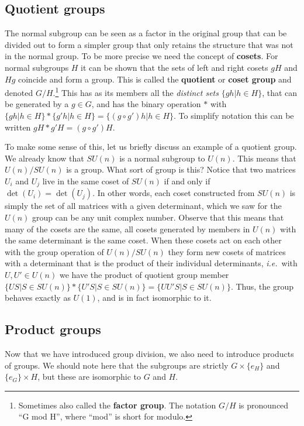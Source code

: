 \documentclass[notes.tex]{subfiles}
\begin{document}
\subsection{Quotient groups}
The normal subgroup can be seen as a factor in the original group that can be divided out to form a simpler group that only retains the structure that was not in the normal group. To be more precise we need the concept of {\bf cosets}. 
For normal subgroups $H$ it can be shown that the sets of left and right cosets $gH$ and $Hg$ coincide and form a group. This is called the {\bf quotient}  or {\bf coset group} and denoted $G/H$.\footnote{Sometimes also called the {\bf factor group}. The notation $G/H$ is pronounced ``G mod H'', where ``mod'' is short for modulo.}
This has as its members all the {\it distinct sets} $\{gh|h\in H\}$, that can be generated by a $g\in G$, and has the binary operation $*$ with $\{gh|h\in H\}*\{g'h|h\in H\}=\{ (g\circ g')h| h\in H\}$. To simplify notation this can be written $gH*g'H=(g\circ g') H$. 
 
To make some sense of this, let us briefly discuss an example of a quotient group. We already know that $SU(n)$ is a normal subgroup to $U(n)$. This means that $U(n)/SU(n)$ is a group. What sort of group is this? Notice that two matrices $U_i$ and $U_j$ live in the same coset of $SU(n)$ if and only if $\det(U_i)=\det(U_j)$. In other words, each coset constructed from $SU(n)$ is simply the set of all matrices with a given determinant, which we saw for the $U(n)$ group can be any unit complex number. Observe that this means that many of the cosets are the same, all cosets generated by members in $U(n)$ with the same determinant is the same coset. 
When these cosets act on each other with the group operation of $U(n)/SU(n)$ they form new cosets of matrices with a determinant that is the product of their individual determinants, {\it i.e.}\ with $U,U'\in U(n)$ we have the product of quotient group member $\{US|S\in SU(n)\}*\{U'S| S\in SU(n)\}=\{ UU'S| S\in SU(n)\}$. Thus, the group behaves exactly as $U(1)$, and is in fact isomorphic to it.

\subsection{Product groups}
Now that we have introduced group division,  we also need to introduce products of groups. 
We should note here that the subgroups are strictly $G\times\{e_H\}$ and $\{e_G\}\times H$, but these are isomorphic to $G$ and $H$.
\end{document}
